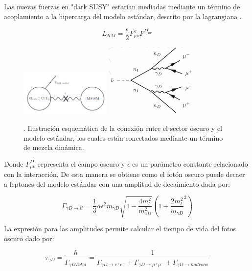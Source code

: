 Las nuevas fuerzas en "dark SUSY" estarían mediadas mediante un término de acoplamiento a la hipercarga del modelo estándar, descrito por la lagrangiana \cite{bb38,bb39}.

\begin{equation} 
L_{KM} = \frac{\epsilon}{2} F_{\mu\nu}^{\gamma}F^{D_{\mu\nu}}
\end{equation}

\begin{figure}
    \centering
    \includegraphics[width=0.4\textwidth]{HIPOTESIS/sketch_darksector.png}
    \includegraphics[width=0.4\textwidth]{HIPOTESIS/darksusy_feynman.png}
    \caption{. Ilustración esquemática de la conexión entre el sector oscuro y el modelo estándar, los cuales están conectados mediante un término de mezcla dinámica.}
    \label{fig:sketch_darksector}
\end{figure}

Donde $F_{\mu\nu}^{D}$ representa el campo oscuro y $\epsilon$ es un parámetro constante relacionado con la interacción.  De esta manera se obtiene como el fotón oscuro puede decaer a leptones \cite{bb41} del modelo estándar con una amplitud de decaimiento dada por:

\begin{equation}
  \Gamma_{\gamma D \rightarrow ll} = \frac{1}{3}\alpha \epsilon^{2} m_{\gamma D} \sqrt{1-\frac{4 m_{l}^{2}}{m_{\gamma D}^2}}(1+\frac{2m_{l}^{2}}{m_{\gamma D}}^{2})
\end{equation}

La expresión para las amplitudes permite calcular el tiempo de vida del fotos oscuro dado por: 

\begin{equation}
  \tau_{\gamma D}= \frac{\hbar}{\Gamma_{\gamma D Total}}=\frac{1}{\Gamma_{\gamma D \rightarrow e^{+}e^{-}}  + \Gamma_{\gamma D \rightarrow \mu^{+}\mu^{-}} + \Gamma_{\gamma D \rightarrow hadrons}}
\end{equation}

